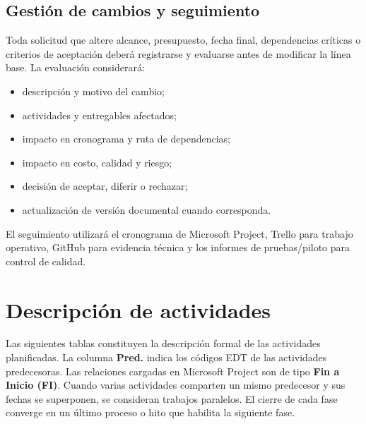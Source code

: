 \documentclass[12pt,a4paper]{article}
\begin{document}
\subsection{Gestión de cambios y seguimiento}

Toda solicitud que altere alcance, presupuesto, fecha final, dependencias críticas o criterios de aceptación deberá registrarse y 
evaluarse antes de modificar la línea base. La evaluación considerará:

\begin{itemize}
    \item descripción y motivo del cambio;
    \item actividades y entregables afectados;
    \item impacto en cronograma y ruta de dependencias;
    \item impacto en costo, calidad y riesgo;
    \item decisión de aceptar, diferir o rechazar;
    \item actualización de versión documental cuando corresponda.
\end{itemize}

El seguimiento utilizará el cronograma de Microsoft Project, Trello para trabajo operativo, GitHub para evidencia técnica y los informes 
de pruebas/piloto para control de calidad.

\section{Descripción de actividades}

Las siguientes tablas constituyen la descripción formal de las actividades planificadas. La columna \textbf{Pred.} indica los códigos EDT 
de las actividades predecesoras. Las relaciones cargadas en Microsoft Project son de tipo \textbf{Fin a Inicio (FI)}. Cuando varias 
actividades comparten un mismo predecesor y sus fechas se superponen, se consideran trabajos paralelos. El cierre de cada fase converge 
en un último proceso o hito que habilita la siguiente fase.
\end{document}
